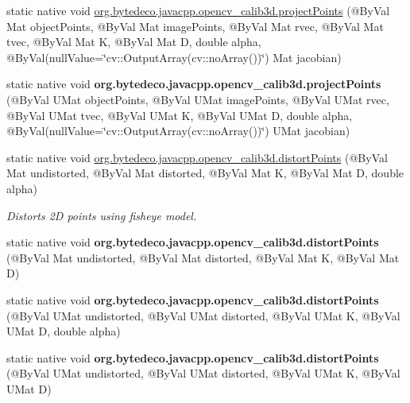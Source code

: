 \begin{DoxyCompactItemize}
\item 
static native void \hyperlink{group__calib3d__fisheye_ga01c2fc60a861f2b9972e00c4837a315b}{org.\+bytedeco.\+javacpp.\+opencv\+\_\+calib3d.\+project\+Points} (@By\+Val Mat object\+Points, @By\+Val Mat image\+Points, @By\+Val Mat rvec, @By\+Val Mat tvec, @By\+Val Mat K, @By\+Val Mat D, double alpha, @By\+Val(null\+Value=\char`\"{}cv\+::\+Output\+Array(cv\+::no\+Array())\char`\"{}) Mat jacobian)
\item 
\mbox{\label{group__calib3d__fisheye_ga13b6302da2b2d24dc94b24389713184c}} 
static native void {\bfseries org.\+bytedeco.\+javacpp.\+opencv\+\_\+calib3d.\+project\+Points} (@By\+Val U\+Mat object\+Points, @By\+Val U\+Mat image\+Points, @By\+Val U\+Mat rvec, @By\+Val U\+Mat tvec, @By\+Val U\+Mat K, @By\+Val U\+Mat D, double alpha, @By\+Val(null\+Value=\char`\"{}cv\+::\+Output\+Array(cv\+::no\+Array())\char`\"{}) U\+Mat jacobian)
\item 
static native void \hyperlink{group__calib3d__fisheye_gacc047f2a04ea647d5dd504de5b1b6ba3}{org.\+bytedeco.\+javacpp.\+opencv\+\_\+calib3d.\+distort\+Points} (@By\+Val Mat undistorted, @By\+Val Mat distorted, @By\+Val Mat K, @By\+Val Mat D, double alpha)
\begin{DoxyCompactList}\small\item\em Distorts 2D points using fisheye model. \end{DoxyCompactList}\item 
\mbox{\label{group__calib3d__fisheye_gad7e705b87f415a7b398c49e6635eb16a}} 
static native void {\bfseries org.\+bytedeco.\+javacpp.\+opencv\+\_\+calib3d.\+distort\+Points} (@By\+Val Mat undistorted, @By\+Val Mat distorted, @By\+Val Mat K, @By\+Val Mat D)
\item 
\mbox{\label{group__calib3d__fisheye_ga845171fc7a5f1c5c22cfd5437ba0cd55}} 
static native void {\bfseries org.\+bytedeco.\+javacpp.\+opencv\+\_\+calib3d.\+distort\+Points} (@By\+Val U\+Mat undistorted, @By\+Val U\+Mat distorted, @By\+Val U\+Mat K, @By\+Val U\+Mat D, double alpha)
\item 
\mbox{\label{group__calib3d__fisheye_gafad17109cef0f995e133e857b7f2cf72}} 
static native void {\bfseries org.\+bytedeco.\+javacpp.\+opencv\+\_\+calib3d.\+distort\+Points} (@By\+Val U\+Mat undistorted, @By\+Val U\+Mat distorted, @By\+Val U\+Mat K, @By\+Val U\+Mat D)

\end{DoxyCompactItemize}
